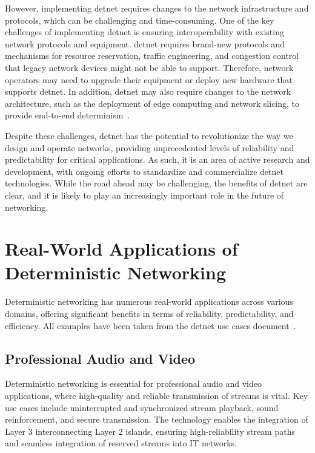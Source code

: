 \documentclass[runningheads]{llncs}
\begin{document}
However, implementing \gls{detnet} requires changes to the network infrastructure and protocols, which can be challenging and time-consuming. One of the key challenges of implementing \gls{detnet} is ensuring interoperability with existing network protocols and equipment. \gls{detnet} requires brand-new protocols and mechanisms for resource reservation, traffic engineering, and congestion control that legacy network devices might not be able to support. Therefore, network operators may need to upgrade their equipment or deploy new hardware that supports \gls{detnet}. In addition, \gls{detnet} may also require changes to the network architecture, such as the deployment of edge computing and network slicing, to provide end-to-end determinism~\cite{rfc8655}.

Despite these challenges, \gls{detnet} has the potential to revolutionize the way we design and operate networks, providing unprecedented levels of reliability and predictability for critical applications. As such, it is an area of active research and development, with ongoing efforts to standardize and commercialize \gls{detnet} technologies. While the road ahead may be challenging, the benefits of \gls{detnet} are clear, and it is likely to play an increasingly important role in the future of networking.

\section{Real-World Applications of Deterministic Networking}

Deterministic networking has numerous real-world applications across various domains, offering significant benefits in terms of reliability, predictability, and efficiency. All examples have been taken from the \gls{detnet} use cases document~\cite{rfc8578}.

\subsection{Professional Audio and Video}
Deterministic networking is essential for professional audio and video applications, where high-quality and reliable transmission of streams is vital. Key use cases include uninterrupted and synchronized stream playback, sound reinforcement, and secure transmission. The technology enables the integration of Layer 3 interconnecting Layer 2 islands, ensuring high-reliability stream paths and seamless integration of reserved streams into IT networks.
\end{document}
